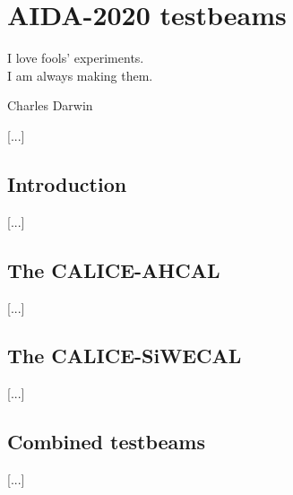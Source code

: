 \chapter{AIDA-2020 testbeams}

\epigraph{I love fools' experiments. \\I am always making them.}{Charles Darwin}

[...]

\section{Introduction}
[...]

\section{The CALICE-AHCAL}
[...]

\section{The CALICE-SiWECAL}
[...]

\section{Combined testbeams}
[...]